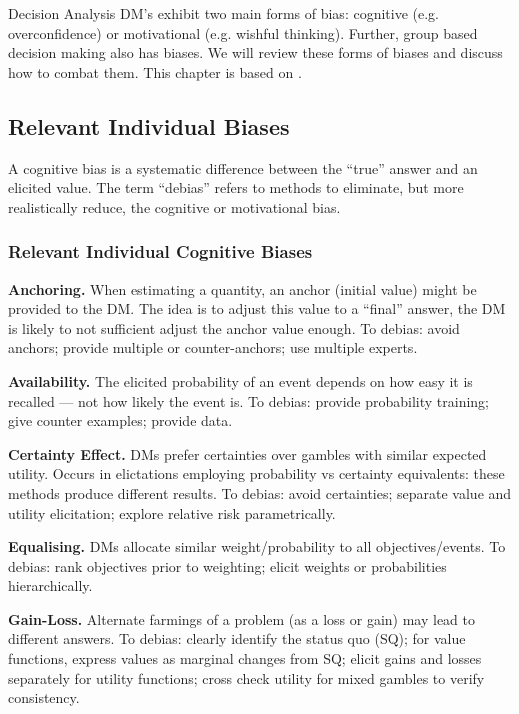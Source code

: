 \begin{chapter}{Decision Analysis \label{Ch:decision}}
DM's exhibit two main forms of bias: cognitive (e.g. overconfidence) or motivational (e.g. wishful thinking). Further, group based decision making also has biases. We will review these forms of biases and discuss how to combat them. This chapter is based on \citet{Montibeller2018}.

\subsection{Relevant Individual Biases}

A cognitive bias is a systematic difference between the ``true'' answer and an elicited value. The term ``debias'' refers to methods to eliminate, but more realistically reduce, the cognitive or motivational bias.

\subsubsection{Relevant Individual Cognitive Biases}

\textbf{Anchoring.}
When estimating a quantity, an anchor (initial value) might be provided to the DM. The idea is to adjust this value to a ``final'' answer, the DM is likely to not sufficient adjust the anchor value enough. To debias: avoid anchors; provide multiple or counter-anchors; use multiple experts.

\noindent\textbf{Availability.}
The elicited probability of an event depends on how easy it is recalled --- not how likely the event is. To debias: provide probability training; give counter examples; provide data.

\noindent\textbf{Certainty Effect.}
DMs prefer certainties over gambles with similar expected utility. Occurs in elictations employing probability vs certainty equivalents: these methods produce different results. To debias: avoid certainties; separate value and utility elicitation; explore relative risk parametrically.

\noindent\textbf{Equalising.} DMs allocate similar weight/probability to all objectives/events. To debias: rank objectives prior to weighting; elicit weights or probabilities hierarchically.

\noindent\textbf{Gain-Loss.} Alternate farmings of a problem (as a loss or gain) may lead to different answers. To debias: clearly identify the status quo (SQ); for value functions, express values as marginal changes from SQ; elicit gains and losses separately for utility functions; cross check utility for mixed gambles to verify consistency.


\end{chapter}
